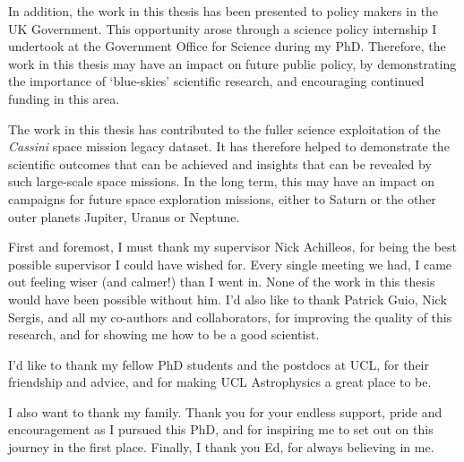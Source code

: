 \begin{impactstatement}
In addition, the work in this thesis has been presented to policy makers in the UK Government. This opportunity arose through a science policy internship I undertook at the Government Office for Science during my PhD. Therefore, the work in this thesis may have an impact on future public policy, by demonstrating the importance of `blue-skies’ scientific research, and encouraging continued funding in this area.

The work in this thesis has contributed to the fuller science exploitation of the \textit{Cassini} space mission legacy dataset. It has therefore helped to demonstrate the scientific outcomes that can be achieved and insights that can be revealed by such large-scale space missions. In the long term, this may have an impact on campaigns for future space exploration missions, either to Saturn or the other outer planets Jupiter, Uranus or Neptune.

\end{impactstatement}

\begin{acknowledgements}
First and foremost, I must thank my supervisor Nick Achilleos, for being the best possible supervisor I could have wished for. Every single meeting we had, I came out feeling wiser (and calmer!) than I went in. None of the work in this thesis would have been possible without him. I'd also like to thank Patrick Guio, Nick Sergis, and all my co-authors and collaborators, for improving the quality of this research, and for showing me how to be a good scientist.

I'd like to thank my fellow PhD students and the postdocs at UCL, for their friendship and advice, and for making UCL Astrophysics a great place to be.

I also want to thank my family. Thank you for your endless support, pride and encouragement as I pursued this PhD, and for inspiring me to set out on this journey in the first place. Finally, I thank you Ed, for always believing in me.
\end{acknowledgements}

\setcounter{tocdepth}{2} 

\tableofcontents

\cleardoublepage %
{}

\listoffigures

\cleardoublepage %
{}

\listoftables

